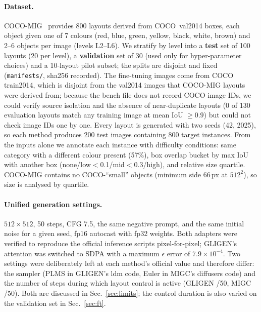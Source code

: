 \documentclass[10pt,twocolumn]{article}
\begin{document}
\paragraph{Dataset.} COCO-MIG~\cite{migc} provides 800 layouts derived from COCO~val2014 boxes, each object given one of 7 colours (red, blue, green, yellow, black, white, brown) and 2--6 objects per image (levels L2--L6). We stratify by level into a \textbf{test} set of 100 layouts (20 per level), a \textbf{validation} set of 30 (used only for hyper-parameter choices) and a 10-layout pilot subset; the splits are disjoint and fixed (\texttt{manifests/}, sha256 recorded). The fine-tuning images come from COCO train2014, which is disjoint from the val2014 images that COCO-MIG layouts were derived from; because the bench file does not record COCO image IDs, we could verify source isolation and the absence of near-duplicate layouts (0 of 130 evaluation layouts match any training image at mean IoU $\geq0.9$) but could not check image IDs one by one. Every layout is generated with two seeds (42, 2025), so each method produces 200 test images containing 800 target instances. From the inputs alone we annotate each instance with difficulty conditions: same category with a different colour present (57\%), box overlap bucket by max IoU with another box (none/low$<$0.1/mid$<$0.3/high), and relative size quartile. COCO-MIG contains no COCO-``small'' objects (minimum side 66\,px at $512^2$), so size is analysed by quartile.

\paragraph{Unified generation settings.} $512{\times}512$, 50 steps, CFG 7.5, the same negative prompt, and the same initial noise for a given seed, fp16 autocast with fp32 weights. Both adapters were verified to reproduce the official inference scripts pixel-for-pixel; GLIGEN's attention was switched to SDPA with a maximum $\epsilon$ error of $7.9{\times}10^{-4}$. Two settings were deliberately left at each method's official value and therefore differ: the sampler (PLMS in GLIGEN's ldm code, Euler in MIGC's diffusers code) and the number of steps during which layout control is active (GLIGEN \GligenSteps/50, MIGC \MigcSteps/50). Both are discussed in Sec.~\ref{sec:limits}; the control duration is also varied on the validation set in Sec.~\ref{sec:ft}.
\end{document}
